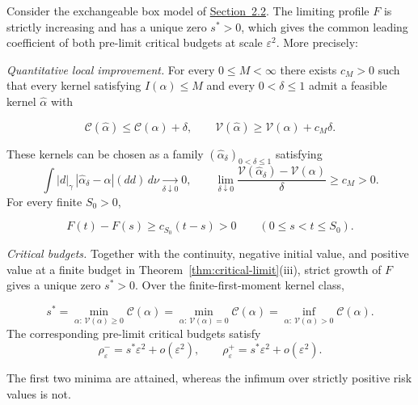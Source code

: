 \begin{theorem}\label{thm:strict-crossing} Consider the exchangeable box model of \mbox{\hyperref[model:critical-box]{Section~2.2}}. The limiting profile \(F\) is strictly increasing and has a unique zero \(s^*>0\), which gives the common leading coefficient of both pre-limit critical budgets at scale \(\varepsilon^2\). More precisely:\begin{resultparts}\item \emph{Quantitative local improvement.} For every \(0\le M<\infty\) there exists \(c_M>0\) such that every kernel satisfying \(I(\alpha)\le M\) and every \(0<\delta\le1\) admit a feasible kernel \(\widehat\alpha\) with

\begin{equation}
\mathcal C(\widehat\alpha)\le\mathcal C(\alpha)+\delta,\qquad
\mathcal V(\widehat\alpha)\ge\mathcal V(\alpha)+c_M\delta.
\tag{3.8}\label{eq:3.8}
\end{equation}

These kernels can be chosen as a family \((\widehat\alpha_\delta)_{0<\delta\le1}\) satisfying
\[
\int |d|_\gamma\,|\widehat\alpha_\delta-\alpha|(dd)\,d\nu
\xrightarrow[\delta\downarrow0]{}0,
\qquad
\lim_{\delta\downarrow0}
\frac{\mathcal V(\widehat\alpha_\delta)-\mathcal V(\alpha)}{\delta}
\ge c_M>0.
\]
For every finite \(S_0>0\),

\begin{equation}
F(t)-F(s)\ge c_{S_0}(t-s)>0\qquad(0\le s<t\le S_0).
\tag{3.9}\label{eq:3.9}
\end{equation}

\item \emph{Critical budgets.} Together with the continuity, negative initial value, and positive value at a finite budget in Theorem~\ref{thm:critical-limit}(iii), strict growth of \(F\) gives a unique zero \(s^*>0\). Over the finite-first-moment kernel class,

\begin{equation}
s^*=\min_{\alpha:\,\mathcal V(\alpha)\ge0}\mathcal C(\alpha)
=\min_{\alpha:\,\mathcal V(\alpha)=0}\mathcal C(\alpha)
=\inf_{\alpha:\,\mathcal V(\alpha)>0}\mathcal C(\alpha).
\tag{3.10}\label{eq:3.10}
\end{equation}
The corresponding pre-limit critical budgets satisfy
\begin{equation}
\rho^-_\varepsilon=s^*\varepsilon^2+o(\varepsilon^2),\qquad
\rho^+_\varepsilon=s^*\varepsilon^2+o(\varepsilon^2).
\tag{3.11}\label{eq:3.11}
\end{equation}

The first two minima are attained, whereas the infimum over strictly positive risk values is not.
\end{resultparts}\end{theorem}

